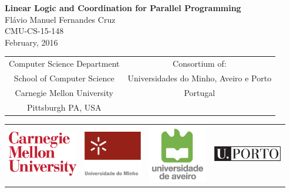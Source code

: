 

\begin{center}
{\huge \bf 
   Linear Logic and Coordination for Parallel Programming
}
\vspace{.25in}
{\LARGE
\\Fl\'{a}vio Manuel Fernandes Cruz\\}
\vspace{.25in}
{\large 
  CMU-CS-15-148
\\ February, 2016 \\}
 \vspace{.5in}

\setlength{\tabcolsep}{2em}
{\large
\begin{tabular}{cc}
\\ Computer Science Department & Consortium of:   \\
School of Computer Science & Universidades do Minho,  Aveiro e Porto \\
Carnegie Mellon University & Portugal \\
Pittsburgh PA, USA &  \\
\end{tabular}
}

\begin{tabular}{cccc}
\\ \includegraphics[width=1.2in]{logos/cmu.eps} & \includegraphics[width=1.0in]{logos/um.jpg}  & \includegraphics[width=1.0in]{logos/ua.jpg} & \includegraphics[width=1.2in]{logos/up.eps} \\
\end{tabular}


\end{center}
